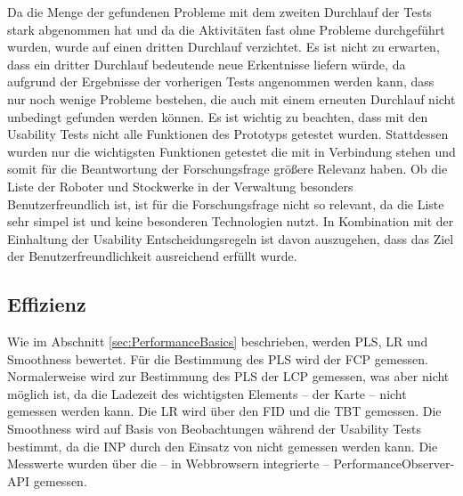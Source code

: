Da die Menge der gefundenen Probleme mit dem zweiten Durchlauf der Tests stark abgenommen hat und da die Aktivitäten fast ohne Probleme durchgeführt wurden, wurde auf einen dritten Durchlauf verzichtet. Es ist nicht zu erwarten, dass ein dritter Durchlauf bedeutende neue Erkentnisse liefern würde, da aufgrund der Ergebnisse der vorherigen Tests angenommen werden kann, dass nur noch wenige Probleme bestehen, die auch mit einem erneuten Durchlauf nicht unbedingt gefunden werden können. Es ist wichtig zu beachten, dass mit den Usability Tests nicht alle Funktionen des Prototyps getestet wurden. Stattdessen wurden nur die wichtigsten Funktionen getestet die mit \deckgl{} in Verbindung stehen und somit für die Beantwortung der Forschungsfrage größere Relevanz haben. Ob die Liste der Roboter und Stockwerke in der Verwaltung besonders Benutzerfreundlich ist, ist für die Forschungsfrage nicht so relevant, da die Liste sehr simpel ist und keine besonderen Technologien nutzt. In Kombination mit der Einhaltung der Usability Entscheidungsregeln ist davon auszugehen, dass das Ziel der Benutzerfreundlichkeit ausreichend erfüllt wurde.

\subsection{Effizienz}
Wie im Abschnitt \ref{sec:PerformanceBasics} beschrieben, werden \ac{PLS}, \ac{LR} und Smoothness bewertet. Für die Bestimmung des \ac{PLS} wird der \ac{FCP} gemessen. Normalerweise wird zur Bestimmung des \ac{PLS} der \ac{LCP} gemessen, was aber nicht möglich ist, da die Ladezeit des wichtigsten Elements – der \deckgl{} Karte – nicht gemessen werden kann. Die \ac{LR} wird über den \ac{FID} und die \ac{TBT} gemessen. Die Smoothness wird auf Basis von Beobachtungen während der Usability Tests bestimmt, da die \ac{INP} durch den Einsatz von \deckgl{} nicht gemessen werden kann. Die Messwerte wurden über die – in Webbrowsern integrierte – PerformanceObserver-\ac{API} \cite{PerformanceObserver} gemessen.




